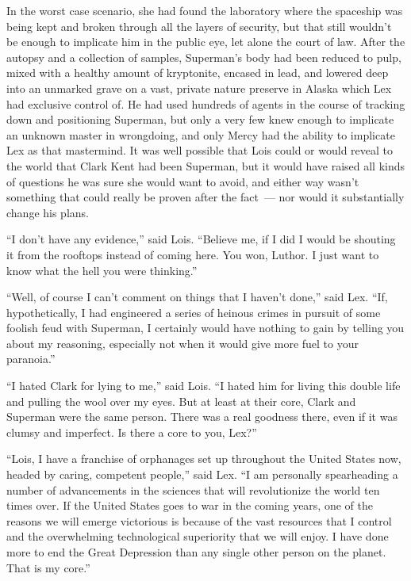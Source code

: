 In the worst case scenario, she had found the laboratory where the
spaceship was being kept and broken through all the layers of security,
but that still wouldn't be enough to implicate him in the public eye,
let alone the court of law. After the autopsy and a collection of
samples, Superman's body had been reduced to pulp, mixed with a healthy
amount of kryptonite, encased in lead, and lowered deep into an unmarked
grave on a vast, private nature preserve in Alaska which Lex had
exclusive control of. He had used hundreds of agents in the course of
tracking down and positioning Superman, but only a very few knew enough
to implicate an unknown master in wrongdoing, and only Mercy had the
ability to implicate Lex as that mastermind. It was well possible that
Lois could or would reveal to the world that Clark Kent had been
Superman, but it would have raised all kinds of questions he was sure
she would want to avoid, and either way wasn't something that could
really be proven after the fact~--- nor would it substantially change
his plans.

``I don't have any evidence,'' said Lois. ``Believe me, if I did I would
be shouting it from the rooftops instead of coming here. You won,
Luthor. I just want to know what the hell you were thinking.''

``Well, of course I can't comment on things that I haven't done,'' said
Lex. ``If, hypothetically, I had engineered a series of heinous crimes
in pursuit of some foolish feud with Superman, I certainly would have
nothing to gain by telling you about my reasoning, especially not when
it would give more fuel to your paranoia.''

``I hated Clark for lying to me,'' said Lois. ``I hated him for living
this double life and pulling the wool over my eyes. But at least at
their core, Clark and Superman were the same person. There was a real
goodness there, even if it was clumsy and imperfect. Is there a core to
you, Lex?''

``Lois, I have a franchise of orphanages set up throughout the United
States now, headed by caring, competent people,'' said Lex. ``I am
personally spearheading a number of advancements in the sciences that
will revolutionize the world ten times over. If the United States goes
to war in the coming years, one of the reasons we will emerge victorious
is because of the vast resources that I control and the overwhelming
technological superiority that we will enjoy. I have done more to end
the Great Depression than any single other person on the planet. That is
my core.''

